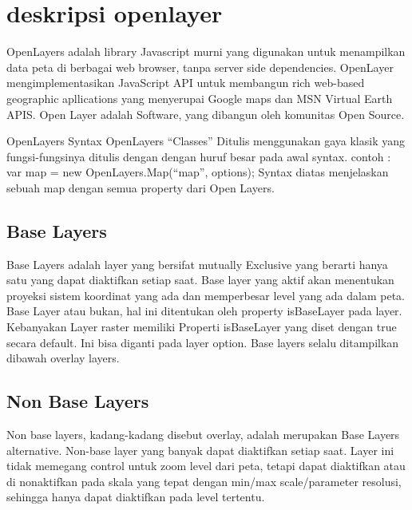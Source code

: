 
\section{deskripsi openlayer}
  OpenLayers adalah library Javascript murni yang digunakan untuk menampilkan data peta di berbagai web browser, tanpa server side dependencies.
  OpenLayer mengimplementasikan JavaScript API untuk membangun rich web-based geographic apllications yang menyerupai Google maps dan MSN Virtual Earth APIS.
  Open Layer adalah Software, yang dibangun oleh komunitas Open Source.
  
  OpenLayers Syntax
  OpenLayers “Classes”
  Ditulis menggunakan gaya klasik yang fungsi-fungsinya ditulis dengan dengan huruf besar pada awal syntax.
  contoh : var map = new OpenLayers.Map(“map”, options);
  Syntax diatas menjelaskan sebuah map dengan semua property dari Open Layers. 
  
\subsection{Base Layers}
 Base Layers adalah layer yang bersifat mutually Exclusive yang berarti hanya satu yang dapat diaktifkan setiap saat. Base layer yang aktif akan menentukan proyeksi sistem koordinat yang ada dan memperbesar level yang ada dalam peta. Base Layer atau bukan, hal ini ditentukan oleh property isBaseLayer pada layer. Kebanyakan Layer raster memiliki Properti isBaseLayer yang diset dengan true secara default. Ini bisa diganti pada layer option. Base layers selalu ditampilkan dibawah overlay layers.

\subsection{Non Base Layers}
Non base layers, kadang-kadang disebut overlay, adalah merupakan Base Layers alternative. Non-base layer yang banyak dapat diaktifkan setiap saat. Layer ini tidak memegang control untuk zoom level dari peta, tetapi dapat diaktifkan atau di nonaktifkan pada skala yang tepat dengan min/max scale/parameter resolusi, sehingga hanya dapat diaktifkan pada level tertentu.



